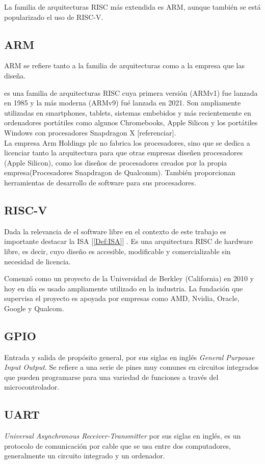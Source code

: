 La familia de arquitecturas RISC más extendida es ARM, aunque también se está popularizado el uso de RISC-V.

\subsection{ARM}
ARM se refiere tanto a la familia de arquitecturas como a la empresa que las diseña.

 es una familia de arquitecturas RISC cuya primera versión (ARMv1) fue lanzada en 1985 y la más moderna (ARMv9) fué lanzada en 2021. Son ampliamente utilizadas en smartphones, tablets, sistemas embebidos y más recientemente en ordenadores portátiles como algunos Chromebooks, Apple Silicon y los portátiles Windows con procesadores Snapdragon X [referenciar].\\

La empresa Arm Holdings plc no fabrica los procesadores, sino que se dedica a licenciar tanto la arquitectura para que otras empresas diseñen procesadores (Apple Silicon), como los diseños de procesadores creados por la propia empresa(Procesadores Snapdragon de Qualcomm). También proporcionan herramientas de desarrollo de software para sus procesadores.

\subsection{RISC-V}
Dada la relevancia de el software libre en el contexto de este trabajo es importante destacar la ISA [\ref{Def:ISA}] . Es una arquitectura RISC de hardware libre, es decir, cuyo diseño es accesible, modificable y comercializable sin necesidad de licencia.

Comenzó como un proyecto de la Universidad de Berkley (California) en 2010 y hoy en día es usado ampliamente utilizado en la industria. La fundación que supervisa el proyecto es apoyada por empresas como AMD, Nvidia, Oracle, Google y Qualcom. \cite{RISC-V_BOOK}

\subsection{GPIO}
Entrada y salida de propósito general,  por sus siglas en inglés \emph{General Purpouse Input Output}. Se refiere a una serie de pines muy comunes en circuitos integrados que pueden programarse para una variedad de funciones a través del microcontrolador. 

\subsection{UART}
\emph{Universal Asynchronous Receiver-Transmitter} por sus siglas en inglés,  es un protocolo de comunicación por cable que se usa entre dos computadores, generalmente un circuito integrado y un ordenador. \cite{UART_BIB}

